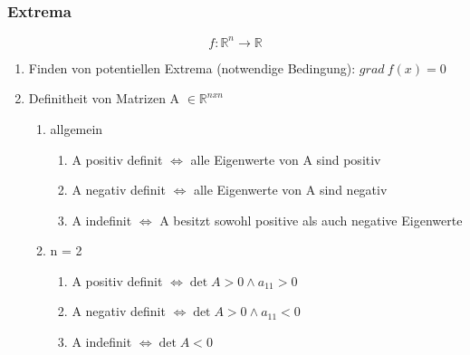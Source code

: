 \documentclass[]{article}
\begin{document}
			\subsubsection{Extrema}
			
			\begin{displaymath}
			f: \mathbb{R}^n \to \mathbb{R}
			\end{displaymath}
			
			\begin{enumerate}[]
				\item Finden von potentiellen Extrema (notwendige Bedingung): \begin{math} grad \ f(x) = 0\end{math}
				\item Definitheit von Matrizen A \begin{math} \in \mathbb{R}^{nxn} \end{math}
				\begin{enumerate}[]
					\item allgemein
					\begin{enumerate}[]
						\item A positiv definit \begin{math} \Leftrightarrow \end{math} alle Eigenwerte von A sind positiv
						\item A negativ definit \begin{math} \Leftrightarrow \end{math} alle Eigenwerte von A sind negativ				
						\item A indefinit \begin{math} \Leftrightarrow \end{math} A besitzt sowohl positive als auch negative Eigenwerte
					\end{enumerate}
					\item n = 2 
					\begin{enumerate}[]
						\item A positiv definit \begin{math} \Leftrightarrow \det A > 0 \wedge a_{11} > 0 \end{math}
						\item A negativ definit \begin{math} \Leftrightarrow \det A > 0 \wedge a_{11} < 0 \end{math}
						\item A indefinit \begin{math} \Leftrightarrow \det A < 0 \end{math}

\end{enumerate}
\end{enumerate}
\end{enumerate}
\end{document}
